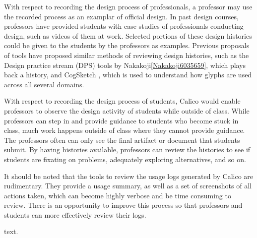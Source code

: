 With respect to recording the design process of professionals, a professor may use the recorded process as an examplar of official design. In past design courses, professors have provided students with case studies of professionals conducting design, such as videos of them at work. Selected portions of these design histories could be given to the students by the professors as examples. Previous proposals of tools have proposed similar methods of reviewing design histories, such as the Design practice stream (DPS) tools by Nakakoji\ref{Nakakoji6035659}, which plays back a history, and CogSketch \cite{Forbus1149}, which is used to understand how glyphs are used across all several domains.

With respect to recording the design process of students, Calico would enable professors to observe the design activity of students while outside of class. While professors can step in and provide guidance to students who become stuck in class, much work happens outside of class where they cannot provide guidance. The professors often can only see the final artifact or document that students submit. By having histories available, professors can review the histories to see if students are fixating on problems, adequately exploring alternatives, and so on.

It should be noted that the tools to review the usage logs generated by Calico are rudimentary. They provide a usage summary, as well as a set of screenshots of all actions taken, which can become highly verbose and be time consuming to review. There is an opportunity to improve this process so that professors and students can more effectively review their logs.

%
%

text.

